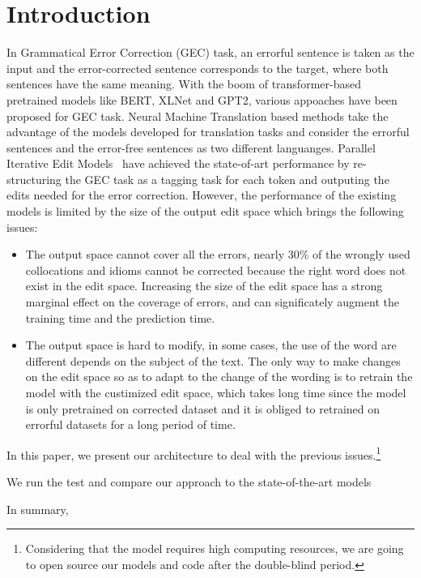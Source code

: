 \section{Introduction}

In Grammatical Error Correction (GEC) task, an errorful sentence is taken as the input and the error-corrected sentence corresponds to the target, where both sentences have the same meaning. With the boom of transformer-based pretrained models like BERT, XLNet and GPT2, various appoaches have been proposed for GEC task. Neural Machine Translation based methods take the advantage of the models developed for translation tasks and consider the errorful sentences and the error-free sentences as two different languanges. Parallel Iterative Edit Models~\cite{Awasthi_2019} have achieved the state-of-art performance by re-structuring the GEC task as a tagging task for each token and outputing the edits needed for the error correction. However, the performance of the existing models is limited by the size of the output edit space which brings the following issues:

\begin{itemize}
\item The output space cannot cover all the errors, nearly 30\% of the wrongly used collocations and idioms cannot be corrected because the right word does not exist in the edit space. Increasing the size of the edit space has a strong marginal effect on the coverage of errors, and can significately augment the training time and the prediction time.

\item The output space is hard to modify, in some cases, the use of the word are different depends on the subject of the text. The only way to make changes on the edit space so as to adapt to the change of the wording is to retrain the model with the custimized edit space, which takes long time since the model is only pretrained on corrected dataset and it is obliged to retrained on errorful datasets for a long period of time. 

\end{itemize}

In this paper, we present our architecture to deal with the previous issues.\footnote{Considering that the model requires high computing resources, we are going to open source our models and code after the double-blind period.}




We run the test 
and compare our approach to the state-of-the-art models

In summary, 


